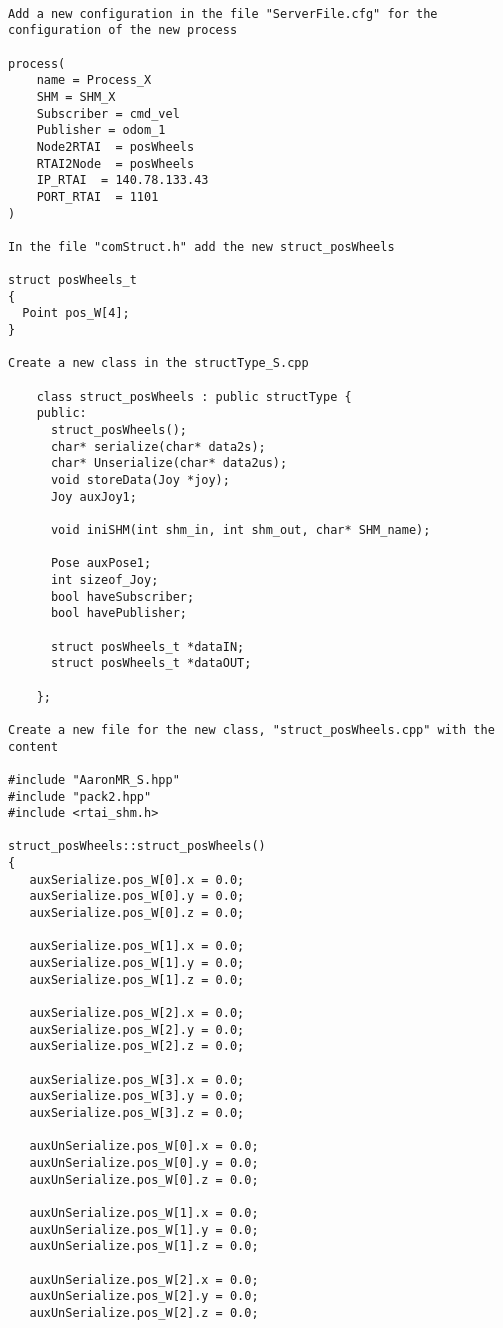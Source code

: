 \begin{verbatim}

Add a new configuration in the file "ServerFile.cfg" for the configuration of the new process

process(
	name = Process_X
	SHM = SHM_X
	Subscriber = cmd_vel
	Publisher = odom_1
 	Node2RTAI  = posWheels
	RTAI2Node  = posWheels
	IP_RTAI  = 140.78.133.43
	PORT_RTAI  = 1101
)

In the file "comStruct.h" add the new struct_posWheels

struct posWheels_t
{
  Point pos_W[4];
}

Create a new class in the structType_S.cpp

    class struct_posWheels : public structType {
    public:
      struct_posWheels();
      char* serialize(char* data2s);
      char* Unserialize(char* data2us);
      void storeData(Joy *joy);
      Joy auxJoy1;

      void iniSHM(int shm_in, int shm_out, char* SHM_name);

      Pose auxPose1;
      int sizeof_Joy;
      bool haveSubscriber;
      bool havePublisher;

      struct posWheels_t *dataIN;
      struct posWheels_t *dataOUT;

    };

Create a new file for the new class, "struct_posWheels.cpp" with the content

#include "AaronMR_S.hpp"
#include "pack2.hpp"
#include <rtai_shm.h>

struct_posWheels::struct_posWheels()
{
   auxSerialize.pos_W[0].x = 0.0;
   auxSerialize.pos_W[0].y = 0.0;
   auxSerialize.pos_W[0].z = 0.0;

   auxSerialize.pos_W[1].x = 0.0;
   auxSerialize.pos_W[1].y = 0.0;
   auxSerialize.pos_W[1].z = 0.0;

   auxSerialize.pos_W[2].x = 0.0;
   auxSerialize.pos_W[2].y = 0.0;
   auxSerialize.pos_W[2].z = 0.0;

   auxSerialize.pos_W[3].x = 0.0;
   auxSerialize.pos_W[3].y = 0.0;
   auxSerialize.pos_W[3].z = 0.0;

   auxUnSerialize.pos_W[0].x = 0.0;
   auxUnSerialize.pos_W[0].y = 0.0;
   auxUnSerialize.pos_W[0].z = 0.0;

   auxUnSerialize.pos_W[1].x = 0.0;
   auxUnSerialize.pos_W[1].y = 0.0;
   auxUnSerialize.pos_W[1].z = 0.0;

   auxUnSerialize.pos_W[2].x = 0.0;
   auxUnSerialize.pos_W[2].y = 0.0;
   auxUnSerialize.pos_W[2].z = 0.0;


\end{verbatim}

